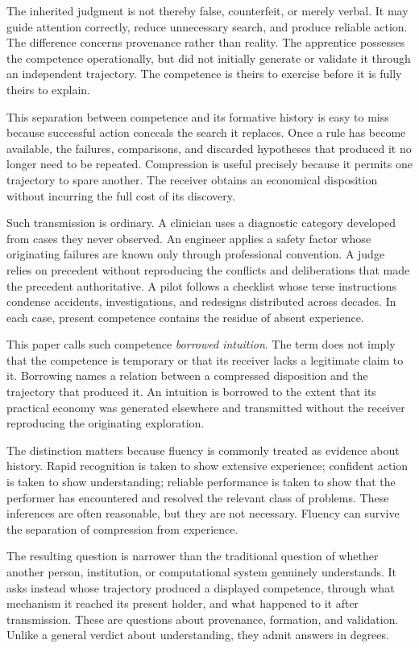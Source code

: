 \documentclass[11pt]{article}
\begin{document}
The inherited judgment is not thereby false, counterfeit, or merely verbal. It may guide attention correctly, reduce unnecessary search, and produce reliable action. The difference concerns provenance rather than reality. The apprentice possesses the competence operationally, but did not initially generate or validate it through an independent trajectory. The competence is theirs to exercise before it is fully theirs to explain.

This separation between competence and its formative history is easy to miss because successful action conceals the search it replaces. Once a rule has become available, the failures, comparisons, and discarded hypotheses that produced it no longer need to be repeated. Compression is useful precisely because it permits one trajectory to spare another. The receiver obtains an economical disposition without incurring the full cost of its discovery.

Such transmission is ordinary. A clinician uses a diagnostic category developed from cases they never observed. An engineer applies a safety factor whose originating failures are known only through professional convention. A judge relies on precedent without reproducing the conflicts and deliberations that made the precedent authoritative. A pilot follows a checklist whose terse instructions condense accidents, investigations, and redesigns distributed across decades. In each case, present competence contains the residue of absent experience.

This paper calls such competence \emph{borrowed intuition}. The term does not imply that the competence is temporary or that its receiver lacks a legitimate claim to it. Borrowing names a relation between a compressed disposition and the trajectory that produced it. An intuition is borrowed to the extent that its practical economy was generated elsewhere and transmitted without the receiver reproducing the originating exploration.

The distinction matters because fluency is commonly treated as evidence about history. Rapid recognition is taken to show extensive experience; confident action is taken to show understanding; reliable performance is taken to show that the performer has encountered and resolved the relevant class of problems. These inferences are often reasonable, but they are not necessary. Fluency can survive the separation of compression from experience.

The resulting question is narrower than the traditional question of whether another person, institution, or computational system genuinely understands. It asks instead whose trajectory produced a displayed competence, through what mechanism it reached its present holder, and what happened to it after transmission. These are questions about provenance, formation, and validation. Unlike a general verdict about understanding, they admit answers in degrees.
\end{document}
